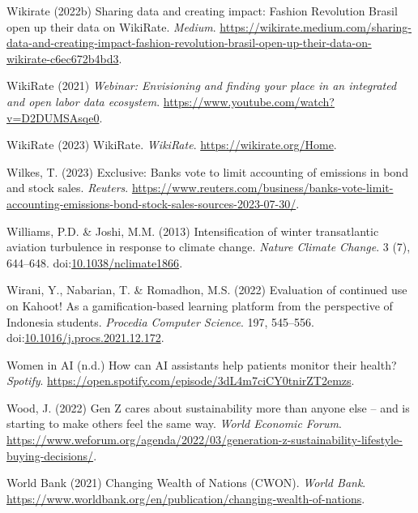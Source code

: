 \documentclass[
  letterpaper,
  DIV=11,
  numbers=noendperiod]{scrartcl}
\newlength{\cslhangindent}
\newenvironment{CSLReferences}[2] %
 {\begin{list}{}{%
  \setlength{\itemindent}{0pt}
  \setlength{\leftmargin}{0pt}
  \setlength{\parsep}{0pt}
  \ifodd #1
   \setlength{\leftmargin}{\cslhangindent}
   \setlength{\itemindent}{-1\cslhangindent}
  \fi
  \setlength{\itemsep}{#2\baselineskip}}}
 {\end{list}}
\begin{document}
\begin{CSLReferences}{0}{1}
Wikirate (2022b) Sharing data and creating impact: {Fashion Revolution
Brasil} open up their data on {WikiRate}. \emph{Medium}.
\url{https://wikirate.medium.com/sharing-data-and-creating-impact-fashion-revolution-brasil-open-up-their-data-on-wikirate-c6ec672b4bd3}.

WikiRate (2021) \emph{Webinar: {Envisioning} and finding your place in
an integrated and open labor data ecosystem}.
\url{https://www.youtube.com/watch?v=D2DUMSAsqe0}.

WikiRate (2023) {WikiRate}. \emph{WikiRate}.
\url{https://wikirate.org/Home}.

Wilkes, T. (2023) Exclusive: {Banks} vote to limit accounting of
emissions in bond and stock sales. \emph{Reuters}.
\url{https://www.reuters.com/business/banks-vote-limit-accounting-emissions-bond-stock-sales-sources-2023-07-30/}.

Williams, P.D. \& Joshi, M.M. (2013) Intensification of winter
transatlantic aviation turbulence in response to climate change.
\emph{Nature Climate Change}. 3 (7), 644--648.
doi:\href{https://doi.org/10.1038/nclimate1866}{10.1038/nclimate1866}.

Wirani, Y., Nabarian, T. \& Romadhon, M.S. (2022) Evaluation of
continued use on {Kahoot}! As a gamification-based learning platform
from the perspective of {Indonesia} students. \emph{Procedia Computer
Science}. 197, 545--556.
doi:\href{https://doi.org/10.1016/j.procs.2021.12.172}{10.1016/j.procs.2021.12.172}.

Women in AI (n.d.) How can {AI} assistants help patients monitor their
health? \emph{Spotify}.
\url{https://open.spotify.com/episode/3dL4m7ciCY0tnirZT2emzs}.

Wood, J. (2022) Gen {Z} cares about sustainability more than anyone else
-- and is starting to make others feel the same way. \emph{World
Economic Forum}.
\url{https://www.weforum.org/agenda/2022/03/generation-z-sustainability-lifestyle-buying-decisions/}.

World Bank (2021) Changing {Wealth} of {Nations} ({CWON}). \emph{World
Bank}.
\url{https://www.worldbank.org/en/publication/changing-wealth-of-nations}.


\end{CSLReferences}
\end{document}
